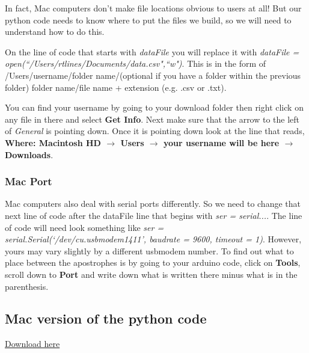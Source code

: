 In fact, Mac computers don't make file locations obvious to users at all! But our python code needs to know where to put the files we build, so we will need to understand how to do this.

On the line of code that starts with \textit{dataFile} you will replace it with \textit{dataFile = open(\textquotedblleft /Users/rtlines/Documents/data.csv",\textquotedblleft w")}. This is in the form of /Users/username/folder name/(optional if you have a folder within
the previous folder) folder name/file name + extension (e.g. .csv or .txt).

You can find your username by going to your download folder then right click on any file in there and select \textbf{Get Info}. Next make sure that the arrow to the left of \textit{General} is pointing down. Once it is pointing down look at the line that reads, \textbf{Where: Macintosh HD $\rightarrow $ Users $\rightarrow $ your username will be here $\rightarrow $ Downloads}.

\subsubsection{Mac Port}

Mac computers also deal with serial ports differently. So we need to change that next line of code after the dataFile line that begins with \textit{ser = serial...}. The line of code will need look something like \textit{ser = serial.Serial(`/dev/cu.usbmodem1411', baudrate = 9600, timeout = 1)}. However, yours may vary slightly by a different usbmodem number. To find out
what to place between the apostrophes is by going to your arduino code, click on \textbf{Tools}, scroll down to \textbf{Port} and write down what is written there minus what is in the parenthesis.

\subsection{Mac version of the python code}

\href{https://raw.githubusercontent.com/rtlines/IntermediateLabPH250/main/Code/Data2Computer_PythonSide_Mac.py}{Download here}

